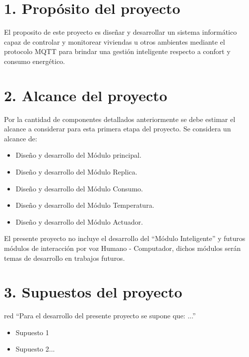 \documentclass[11pt]{charter}
\begin{document}
\section{1. Propósito del proyecto}
\label{sec:proposito}

El proposito de este proyecto es diseñar y desarrollar un sistema informático capaz de controlar y monitorear viviendas u otros ambientes mediante el protocolo MQTT para brindar una gestión inteligente respecto a confort y consumo energético.


\section{2. Alcance del proyecto}
\label{sec:alcance}

Por la cantidad de componentes detallados anteriormente se debe estimar el alcance a considerar para esta primera etapa del proyecto. Se considera un alcance de: 
\begin{itemize}
\item Diseño y desarrollo del Módulo principal.
\item Diseño y desarrollo del Módulo Replica.
\item Diseño y desarrollo del Módulo Consumo.
\item Diseño y desarrollo del Módulo Temperatura.
\item Diseño y desarrollo del Módulo Actuador.
\end{itemize}

El presente proyecto no incluye el desarrollo del ``Módulo Inteligente'' y futuros módulos de interacción por voz Humano - Computador, dichos módulos serán temas de desarrollo en trabajos futuros.

\section{3. Supuestos del proyecto}
\label{sec:supuestos}

\begin{consigna}{red}
``Para el desarrollo del presente proyecto se supone que: ...''
\begin{itemize}
\item Supuesto 1
\item Supuesto 2...
\end{itemize}


\end{consigna}
\end{document}
